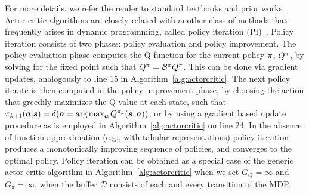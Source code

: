 \documentclass[../thesis.tex]{subfiles}
\begin{document}
For more details, we refer the reader to standard textbooks and prior works~\citep{sb-irl-98,konda2000actor}.
Actor-critic algorithms are closely related with another class of methods that frequently arises in dynamic programming, called policy iteration (PI)~\citep{lagoudakis2003least}. Policy iteration consists of two phases: policy evaluation and policy improvement. The policy evaluation phase computes the Q-function for the current policy $\pi$, $Q^\pi$, by solving for the fixed point such that $Q^\pi = \mathcal{B}^\pi Q^\pi$. This can be done via gradient updates, analogously to line 15 in Algorithm~\ref{alg:actorcritic}. The next policy iterate is then computed in the policy improvement phase, by choosing the action that greedily maximizes the Q-value at each state, such that $\pi_{k+1}(\boldsymbol{a}|\boldsymbol{s}) = \delta(\boldsymbol{a} = \arg\max_{\boldsymbol{a}} Q^{\pi_k}(\boldsymbol{s},\boldsymbol{a}))$, or by using a gradient based update procedure as is employed in Algorithm~\ref{alg:actorcritic} on line 24. In the absence of function approximation (e.g., with tabular representations) policy iteration produces a monotonically improving sequence of policies, and converges to the optimal policy. Policy iteration can be obtained as a special case of the generic actor-critic algorithm in Algorithm~\ref{alg:actorcritic} when we set $G_Q = \infty$ and $G_\pi = \infty$, when the buffer $\mathcal{D}$ consists of each and every transition of the MDP.


\end{document}
